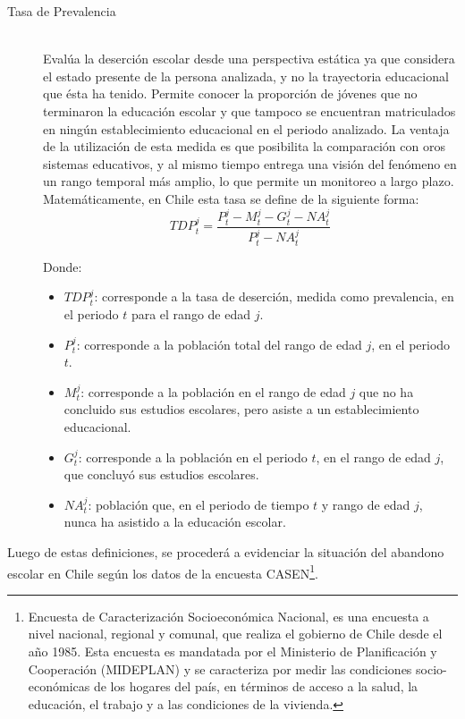\begin{description}
\item[Tasa de Prevalencia] \hfill \\
  Evalúa la deserción escolar desde una perspectiva estática ya que considera el estado presente de la persona analizada, y no la trayectoria educacional que ésta ha tenido. Permite conocer la proporción de jóvenes que no terminaron la educación escolar y que tampoco se encuentran matriculados en ningún establecimiento educacional en el periodo analizado.
  La ventaja de la utilización de esta medida es que posibilita la comparación con oros sistemas educativos, y al mismo tiempo entrega una visión del fenómeno en un rango temporal más amplio, lo que permite un monitoreo a largo plazo.
  Matemáticamente, en Chile esta tasa se define de la siguiente forma:\\
   
   \begin{equation}
TDP_t^j = \frac{P_{t}^{j} - M_{t}^{j} - G_{t}^{j} - NA_{t}^{j}}{P_{t}^{j} - NA_{t}^{j}}
    \end{equation}
    
Donde:
\begin{itemize}[label=]
    \item $TDP_t^j$: corresponde a la tasa de deserción, medida
como prevalencia, en el periodo $t$ para el rango de edad $j$.
    \item $P_{t}^{j}$:  corresponde a la población total del rango de edad $j$, en el periodo $t$.
    \item $M_{t}^{j}$: corresponde a la población en el rango de edad $j$ que no ha concluido sus estudios escolares, pero asiste a un establecimiento educacional.
    \item $G_{t}^{j}$: corresponde a la población en el periodo $t$, en el rango de edad $j$, que concluyó sus estudios escolares.
    \item $NA_{t}^{j}$: población que, en el periodo de tiempo $t$ y rango de edad $j$, nunca ha asistido a la educación escolar.
\end{itemize}
\end{description}

Luego de estas definiciones, se procederá a evidenciar la situación del abandono escolar en Chile según los datos de la encuesta CASEN\footnote{Encuesta de Caracterización Socioeconómica Nacional, es una encuesta a nivel nacional, regional y comunal, que realiza el gobierno de Chile desde el año 1985. Esta encuesta es mandatada por el Ministerio de Planificación y Cooperación (MIDEPLAN) y se caracteriza por medir las condiciones socio-económicas de los hogares del país, en términos de acceso a la salud, la educación, el trabajo y a las condiciones de la vivienda.}.

